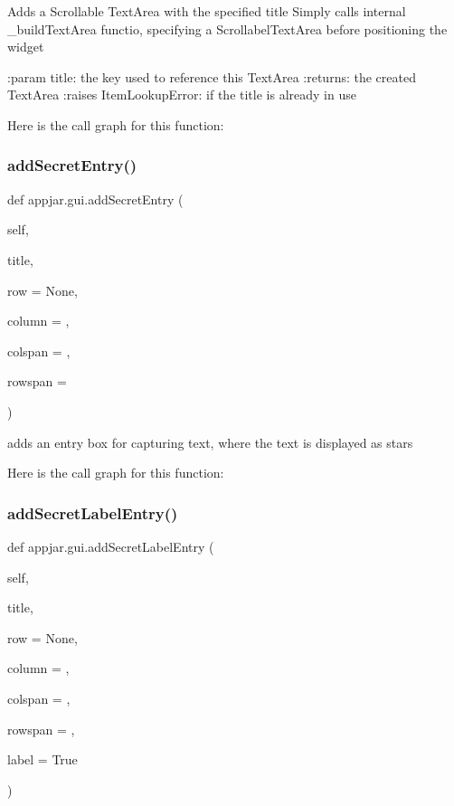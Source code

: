\begin{DoxyVerb}Adds a Scrollable TextArea with the specified title
Simply calls internal _buildTextArea functio, specifying a ScrollabelTextArea before positioning the widget

:param title: the key used to reference this TextArea
:returns: the created TextArea
:raises ItemLookupError: if the title is already in use
\end{DoxyVerb}
 Here is the call graph for this function\+:
\mbox{\label{classappjar_1_1gui_a381f2ac572caacb5cf15205a5ef22a3b}} 
\subsubsection{\texorpdfstring{add\+Secret\+Entry()}{addSecretEntry()}}
{\footnotesize\ttfamily def appjar.\+gui.\+add\+Secret\+Entry (\begin{DoxyParamCaption}\item[{}]{self,  }\item[{}]{title,  }\item[{}]{row = {\ttfamily None},  }\item[{}]{column = {},  }\item[{}]{colspan = {},  }\item[{}]{rowspan = {} }\end{DoxyParamCaption})}

\begin{DoxyVerb}adds an entry box for capturing text, where the text is displayed as stars \end{DoxyVerb}
 Here is the call graph for this function\+:
\mbox{\label{classappjar_1_1gui_af51abc40152c99c140f32c5a693ccc40}} 
\subsubsection{\texorpdfstring{add\+Secret\+Label\+Entry()}{addSecretLabelEntry()}}
{\footnotesize\ttfamily def appjar.\+gui.\+add\+Secret\+Label\+Entry (\begin{DoxyParamCaption}\item[{}]{self,  }\item[{}]{title,  }\item[{}]{row = {\ttfamily None},  }\item[{}]{column = {},  }\item[{}]{colspan = {},  }\item[{}]{rowspan = {},  }\item[{}]{label = {\ttfamily True} }\end{DoxyParamCaption})}

